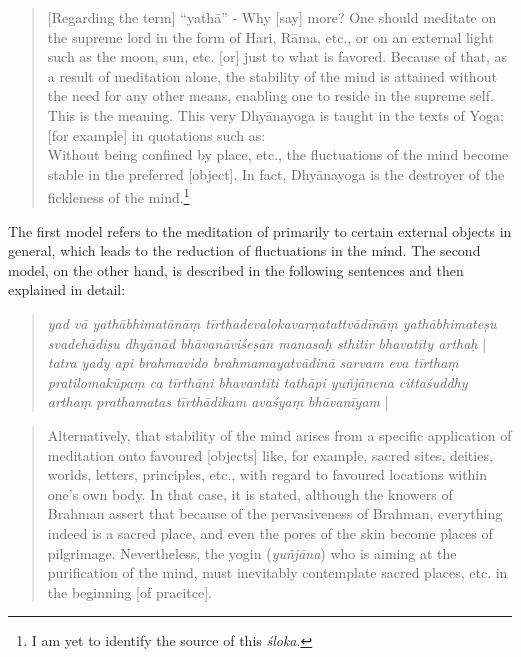 \begin{quote}
  [Regarding the term] ``yathā'' - Why [say] more? One should meditate on the supreme lord in the form of Hari, Rāma, etc., or on an external light such as the moon, sun, etc. [or] just to what is favored. Because of that, as a result of meditation alone, the stability of the mind is attained without the need for any other means, enabling one to reside in the supreme self. This is the meaning. This very Dhyānayoga is taught in the texts of Yoga; [for example] in quotations such as: \\

  Without being confined by place, etc., the fluctuations of the mind become stable in the preferred [object]. In fact, Dhyānayoga is the destroyer of the fickleness of the mind.\footnote{I am yet to identify the source of this \textit{śloka}.}\\
  
\end{quote}

The first model refers to the meditation of primarily to certain external objects in general, which leads to the reduction of fluctuations in the mind. 
The second model, on the other hand, is described in the following sentences and then explained in detail:

\begin{quote}
\textit{yad vā yathābhimatānāṃ tīrthadevalokavarṇatattvādīnāṃ yathābhimateṣu svadehādiṣu dhyānād bhāvanāviśeṣān manasaḥ sthitir bhavatīty arthaḥ} | \textit{tatra yady api brahmavido brahmamayatvādinā sarvam eva tīrthaṃ pratilomakūpaṃ ca tīrthāni bhavantīti tathāpi yuñjānena cittaśuddhy arthaṃ prathamatas tīrthādikam avaśyaṃ bhāvanīyam} |
\end{quote}
\begin{quote}
 Alternatively, that stability of the mind arises from a specific application of meditation onto favoured [objects] like, for example, sacred sites, deities, worlds, letters, principles, etc., with regard to favoured locations within one's own body. In that case, it is stated, although the knowers of Brahman assert that because of the pervasiveness of Brahman, everything indeed is a sacred place, and even the pores of the skin become places of pilgrimage. Nevertheless, the yogin (\textit{yuñjāna}) who is aiming at the purification of the mind, must inevitably contemplate sacred places, etc. in the beginning [of pracitce].   
  \end{quote}

